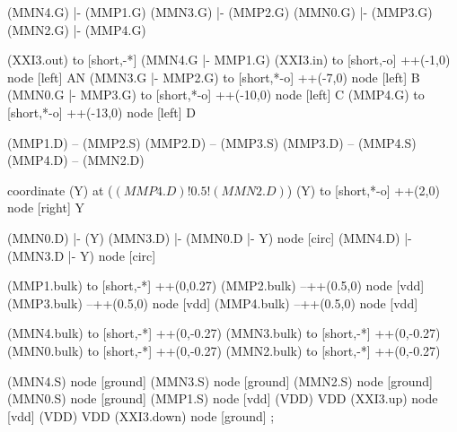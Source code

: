 \begin{circuitikz}[american]

	(MMN4.G) |- (MMP1.G)
	(MMN3.G) |- (MMP2.G)
	(MMN0.G) |- (MMP3.G)
	(MMN2.G) |- (MMP4.G)
	
	(XXI3.out) to [short,-*] (MMN4.G |- MMP1.G)
	(XXI3.in) to [short,-o] ++(-1,0) node [left] {AN}
	(MMN3.G |- MMP2.G) to [short,*-o] ++(-7,0) node [left] {B}
	(MMN0.G |- MMP3.G) to [short,*-o] ++(-10,0) node [left] {C}
	(MMP4.G) to [short,*-o] ++(-13,0) node [left] {D}	
	
	(MMP1.D) -- (MMP2.S)
	(MMP2.D) -- (MMP3.S)	
	(MMP3.D) -- (MMP4.S)
	(MMP4.D) -- (MMN2.D)
	
	coordinate (Y) at ($(MMP4.D)!0.5!(MMN2.D)$)
	(Y) to [short,*-o] ++(2,0) node [right] {Y}
	
	(MMN0.D) |- (Y)
	(MMN3.D) |- (MMN0.D |- Y) node [circ] {}
	(MMN4.D) |- (MMN3.D |- Y) node [circ] {}
	
	(MMP1.bulk) to [short,-*] ++(0,0.27)
	(MMP2.bulk) --++(0.5,0) node [vdd] {}
	(MMP3.bulk) --++(0.5,0) node [vdd] {}
	(MMP4.bulk) --++(0.5,0) node [vdd] {}
	
	(MMN4.bulk) to [short,-*] ++(0,-0.27)
	(MMN3.bulk) to [short,-*] ++(0,-0.27)
	(MMN0.bulk) to [short,-*] ++(0,-0.27)
	(MMN2.bulk) to [short,-*] ++(0,-0.27)


	(MMN4.S) node [ground] {}
	(MMN3.S) node [ground] {}
	(MMN2.S) node [ground] {}
	(MMN0.S) node [ground] {}
	(MMP1.S) node [vdd] (VDD) {VDD}
	(XXI3.up) node [vdd] (VDD) {VDD}
	(XXI3.down) node [ground] {}
;

\end{circuitikz}
